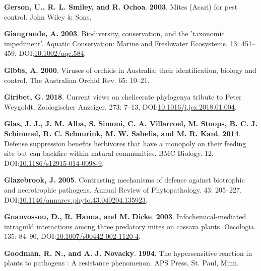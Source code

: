 \documentclass[12pt,final,CPage]{ufthesis}
\newlength{\cslhangindent}
\newenvironment{CSLReferences}[2] %
{%
	\setlength{\parindent}{0pt}
	\ifodd #1 \everypar{\setlength{\hangindent}{\cslhangindent}}\ignorespaces\fi
	\ifnum #2 > 0
	\setlength{\parskip}{#2\baselineskip}
	\fi
}%
{}
\begin{document}
{\begin{CSLReferences}{1}{0}
  \leavevmode{}%
  \textbf{Gerson, U., R. L. Smiley, and R. Ochoa}. \textbf{2003}. Mites ({Acari}) for pest control. John Wiley \& Sons.

  \leavevmode{}%
  \textbf{Giangrande, A.} \textbf{2003}. Biodiversity, conservation, and the 'taxonomic impediment'. Aquatic Conservation: Marine and Freshwater Ecosystems. 13: 451--459, DOI:\href{https://doi.org/10.1002/aqc.584}{10.1002/aqc.584}.

  \leavevmode{}%
  \textbf{Gibbs, A.} \textbf{2000}. Viruses of orchids in {Australia}; their identification, biology and control. The {Australia}n Orchid Rev. 65: 10--21.

  \leavevmode{}%
  \textbf{Giribet, G.} \textbf{2018}. Current views on chelicerate phylogeny{\textemdash}a tribute to {Peter Weygoldt}. Zoologischer Anzeiger. 273: 7--13, DOI:\href{https://doi.org/10.1016/j.jcz.2018.01.004}{10.1016/j.jcz.2018.01.004}.

  \leavevmode{}%
  \textbf{Glas, J. J., J. M. Alba, S. Simoni, C. A. Villarroel, M. Stoops, B. C. J. Schimmel, R. C. Schuurink, M. W. Sabelis, and M. R. Kant}. \textbf{2014}. Defense suppression benefits herbivores that have a monopoly on their feeding site but can backfire within natural communities. {BMC} Biology. 12, DOI:\href{https://doi.org/10.1186/s12915-014-0098-9}{10.1186/s12915-014-0098-9}.

  \leavevmode{}%
  \textbf{Glazebrook, J.} \textbf{2005}. Contrasting mechanisms of defense against biotrophic and necrotrophic pathogens. Annual Review of Phytopathology. 43: 205--227, DOI:\href{https://doi.org/10.1146/annurev.phyto.43.040204.135923}{10.1146/annurev.phyto.43.040204.135923}.

  \leavevmode{}%
  \textbf{Gnanvossou, D., R. Hanna, and M. Dicke}. \textbf{2003}. Infochemical-mediated intraguild interactions among three predatory mites on cassava plants. Oecologia. 135: 84--90, DOI:\href{https://doi.org/10.1007/s00442-002-1120-4}{10.1007/s00442-002-1120-4}.

  \leavevmode{}%
  \textbf{Goodman, R. N., and A. J. Novacky}. \textbf{1994}. The hypersensitive reaction in plants to pathogens : A resistance phenomenon. APS Press, St. Paul, Minn.


\end{CSLReferences}}
\end{document}
